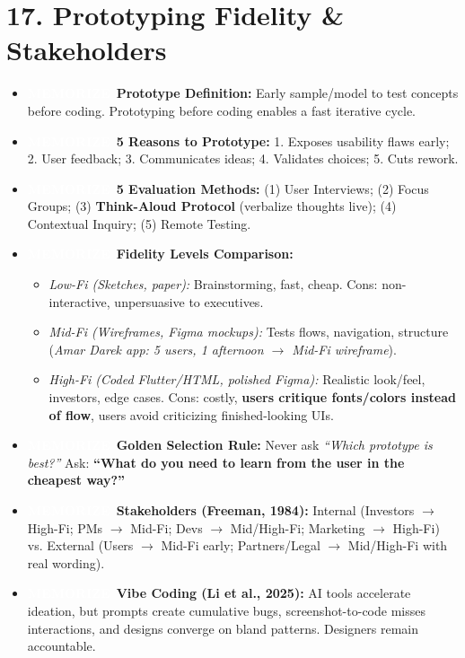 \documentclass[8.5pt,a4paper,twocolumn]{article}
\newcommand{\tagmem}{\colorbox{accentred}{\textcolor{white}{\bfseries\fontsize{5.5pt}{6.5pt}\selectfont MEMORIZE}}\ }
\begin{document}
\section*{17. Prototyping Fidelity \& Stakeholders}
\begin{itemize}[leftmargin=7pt, itemsep=1pt, topsep=0.5pt]
    \item \tagmem \textbf{Prototype Definition:} Early sample/model to test concepts before coding. Prototyping before coding enables a fast iterative cycle.
    \item \tagmem \textbf{5 Reasons to Prototype:} 1. Exposes usability flaws early; 2. User feedback; 3. Communicates ideas; 4. Validates choices; 5. Cuts rework.
    \item \tagmem \textbf{5 Evaluation Methods:} (1) User Interviews; (2) Focus Groups; (3) \textbf{Think-Aloud Protocol} (verbalize thoughts live); (4) Contextual Inquiry; (5) Remote Testing.
    \item \tagmem \textbf{Fidelity Levels Comparison:}
    \begin{itemize}[leftmargin=6pt, itemsep=0.5pt]
        \item \textit{Low-Fi (Sketches, paper):} Brainstorming, fast, cheap. Cons: non-interactive, unpersuasive to executives.
        \item \textit{Mid-Fi (Wireframes, Figma mockups):} Tests flows, navigation, structure (\textit{Amar Darek app: 5 users, 1 afternoon $\to$ Mid-Fi wireframe}).
        \item \textit{High-Fi (Coded Flutter/HTML, polished Figma):} Realistic look/feel, investors, edge cases. Cons: costly, \textbf{users critique fonts/colors instead of flow}, users avoid criticizing finished-looking UIs.
    \end{itemize}
    \item \tagmem \textbf{Golden Selection Rule:} Never ask \textit{``Which prototype is best?''} Ask: \textbf{``What do you need to learn from the user in the cheapest way?''}
    \item \tagmem \textbf{Stakeholders (Freeman, 1984):} Internal (Investors $\to$ High-Fi; PMs $\to$ Mid-Fi; Devs $\to$ Mid/High-Fi; Marketing $\to$ High-Fi) vs. External (Users $\to$ Mid-Fi early; Partners/Legal $\to$ Mid/High-Fi with real wording).
    \item \tagmem \textbf{Vibe Coding (Li et al., 2025):} AI tools accelerate ideation, but prompts create cumulative bugs, screenshot-to-code misses interactions, and designs converge on bland patterns. Designers remain accountable.
\end{itemize}
\end{document}
